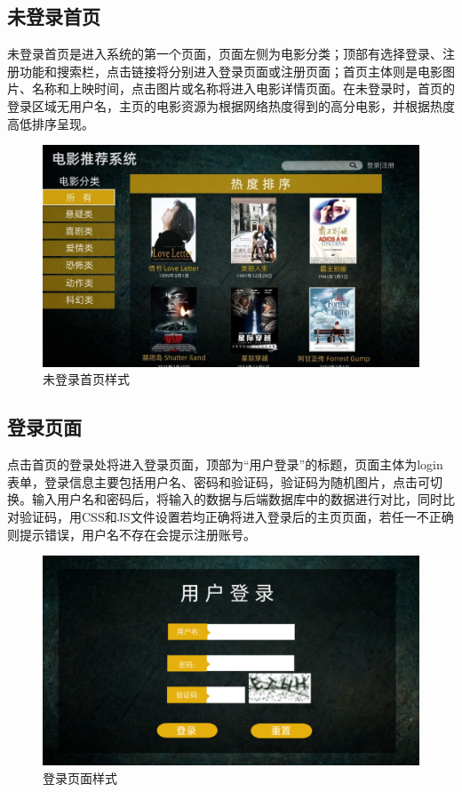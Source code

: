 \documentclass{ctexart}
\begin{document}
\subsection{未登录首页}
未登录首页是进入系统的第一个页面，页面左侧为电影分类；顶部有选择登录、注册功能和搜索栏，点击链接将分别进入登录页面或注册页面；首页主体则是电影图片、名称和上映时间，点击图片或名称将进入电影详情页面。在未登录时，首页的登录区域无用户名，主页的电影资源为根据网络热度得到的高分电影，并根据热度高低排序呈现。
\begin {figure}[h]
\centering %
\includegraphics[width=\textwidth]{p1.jpg}
\caption{未登录首页样式} %
\label{five}
\end {figure}

\subsection{登录页面}
点击首页的登录处将进入登录页面，顶部为“用户登录”的标题，页面主体为login表单，登录信息主要包括用户名、密码和验证码，验证码为随机图片，点击可切换。输入用户名和密码后，将输入的数据与后端数据库中的数据进行对比，同时比对验证码，用CSS和JS文件设置若均正确将进入登录后的主页页面，若任一不正确则提示错误，用户名不存在会提示注册账号。
\begin {figure}[h]
\centering %
\includegraphics[width=\textwidth]{p2.png}
\caption{登录页面样式} %
\label{five}
\end {figure}
\end{document}
